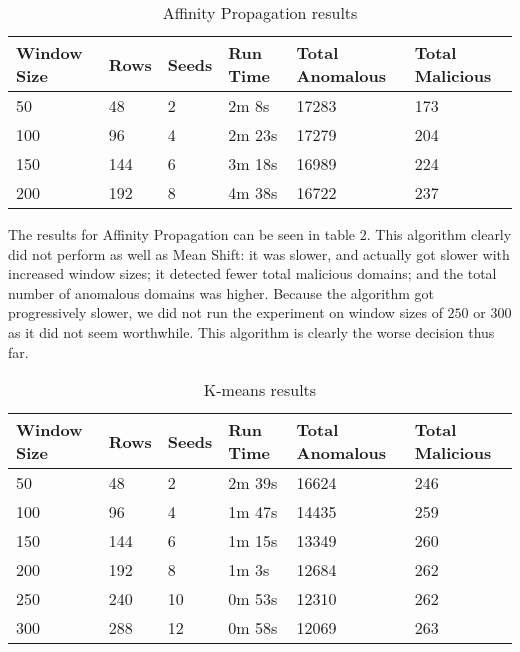 \begin{table}[]
\centering
\caption{Affinity Propagation results}
\label{my-label}
\begin{tabular}{@{}|l|l|l|l|l|l|@{}}
\toprule
Window Size & Rows & Seeds & Run Time & Total Anomalous & Total Malicious \\ \midrule
50          & 48   & 2     & 2m 8s    & 17283           & 173             \\ \midrule
100         & 96   & 4     & 2m 23s   & 17279           & 204             \\ \midrule
150         & 144  & 6     & 3m 18s   & 16989           & 224             \\ \midrule
200         & 192  & 8     & 4m 38s   & 16722           & 237             \\ \bottomrule
\end{tabular}
\end{table}

The results for Affinity Propagation can be seen in table $2$.
This algorithm clearly did not perform as well as Mean Shift:
it was slower, and actually got slower with increased window sizes; it detected fewer total malicious
domains; and the total number of anomalous domains was higher.
Because the algorithm got progressively slower, we did not run the experiment on window sizes of
$250$ or $300$ as it did not seem worthwhile.
This algorithm is clearly the worse decision thus far.

\begin{table}[]
\centering
\caption{K-means results}
\label{my-label}
\begin{tabular}{@{}|l|l|l|l|l|l|@{}}
\toprule
Window Size & Rows & Seeds & Run Time & Total Anomalous & Total Malicious \\ \midrule
50          & 48   & 2     & 2m 39s   & 16624           & 246             \\ \midrule
100         & 96   & 4     & 1m 47s   & 14435           & 259             \\ \midrule
150         & 144  & 6     & 1m 15s   & 13349           & 260             \\ \midrule
200         & 192  & 8     & 1m 3s    & 12684           & 262             \\ \midrule
250         & 240  & 10    & 0m 53s   & 12310           & 262             \\ \midrule
300         & 288  & 12    & 0m 58s   & 12069           & 263             \\ \bottomrule
\end{tabular}
\end{table}

